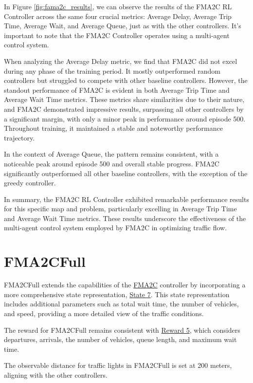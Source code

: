 In Figure \ref{fig:fama2c_results}, we can observe the results of the FMA2C RL Controller across the same four crucial metrics: Average Delay, Average Trip Time, Average Wait, and Average Queue, just as with the other controllers. It's important to note that the FMA2C Controller operates using a multi-agent control system.

When analyzing the Average Delay metric, we find that FMA2C did not excel during any phase of the training period. It mostly outperformed random controllers but struggled to compete with other baseline controllers. However, the standout performance of FMA2C is evident in both Average Trip Time and Average Wait Time metrics. These metrics share similarities due to their nature, and FMA2C demonstrated impressive results, surpassing all other controllers by a significant margin, with only a minor peak in performance around episode 500. Throughout training, it maintained a stable and noteworthy performance trajectory.

In the context of Average Queue, the pattern remains consistent, with a noticeable peak around episode 500 and overall stable progress. FMA2C significantly outperformed all other baseline controllers, with the exception of the greedy controller.

In summary, the FMA2C RL Controller exhibited remarkable performance results for this specific map and problem, particularly excelling in Average Trip Time and Average Wait Time metrics. These results underscore the effectiveness of the multi-agent control system employed by FMA2C in optimizing traffic flow.

\section{FMA2CFull}
FMA2CFull extends the capabilities of the \hyperref[sec:exp-fma2c]{FMA2C} controller by incorporating a more comprehensive state representation, \hyperref[subsec:state-7]{State 7}. This state representation includes additional parameters such as total wait time, the number of vehicles, and speed, providing a more detailed view of the traffic conditions.

The reward for FMA2CFull remains consistent with \hyperref[subsec:reward-5]{Reward 5}, which considers departures, arrivals, the number of vehicles, queue length, and maximum wait time.

The observable distance for traffic lights in FMA2CFull is set at 200 meters, aligning with the other controllers.

